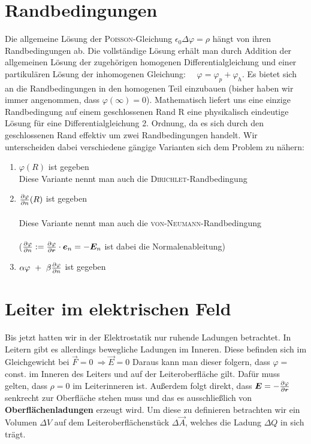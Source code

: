 \section{Randbedingungen}

Die allgemeine Lösung der \textsc{Poisson}-Gleichung $\epsilon_0 \Delta \varphi = \rho$ hängt von ihren Randbedingungen ab. Die vollständige Lösung erhält man durch Addition der allgemeinen Lösung der zugehörigen homogenen Differentialgleichung und einer partikulären Lösung der inhomogenen Gleichung: $\quad \varphi = \varphi_p + \varphi_h$. Es bietet sich an die Randbedingungen in den homogenen Teil einzubauen (bisher haben wir immer angenommen, dass $\varphi (\infty) = 0$). Mathematisch liefert uns eine einzige Randbedingung auf einem geschlossenen Rand R eine physikalisch eindeutige Lösung für eine Differentialgleichung 2. Ordnung, da es sich durch den geschlossenen Rand effektiv um zwei Randbedingungen handelt. Wir unterscheiden dabei verschiedene gängige Varianten sich dem Problem zu nähern:


\begin{enumerate}
\item $\varphi(R)$ ist gegeben\
\\
Diese Variante nennt man auch die \textsc{Dirichlet}-Randbedingung\

\item $\frac{\partial{\varphi}}{\partial{n}}(R)$ ist gegeben\
\\
\ \\
Diese Variante nennt man auch die \textsc{von-Neumann}-Randbedingung\
\\
\ \\
($\frac{\partial{\varphi}}{\partial{n}} := \frac{\partial{\varphi}}{\partial{\bm{r}}}\cdot\bm{e}_n = - \bm{E}_n$ ist dabei die Normalenableitung)\

\item $\alpha \varphi \ + \ \beta\pdiff{\varphi}{n}$ ist gegeben
\end{enumerate}

\section{Leiter im elektrischen Feld}

Bis jetzt hatten wir in der Elektrostatik nur ruhende Ladungen betrachtet. In Leitern  gibt es allerdings bewegliche Ladungen im Inneren. Diese befinden sich im Gleichgewicht bei $\vec{F}=0 \ \Rightarrow \vec{E}= 0$
Daraus kann man dieser folgern, dass $\varphi =$ const. im Inneren des Leiters und auf der Leiteroberfläche gilt. Dafür muss gelten, dass $\rho = 0$ im Leiterinneren ist. Außerdem folgt direkt, dass $\bm{E} = -\frac{\partial{\varphi}}{\partial{\bm{r}}}$ senkrecht zur Oberfläche stehen muss und das es ausschließlich von \textbf{Oberflächenladungen} erzeugt wird. Um diese zu definieren betrachten wir ein Volumen $\Delta V$ auf dem Leiteroberflächenstück $\Delta \vec{A}$, welches die Ladung $\Delta Q$ in sich trägt.

